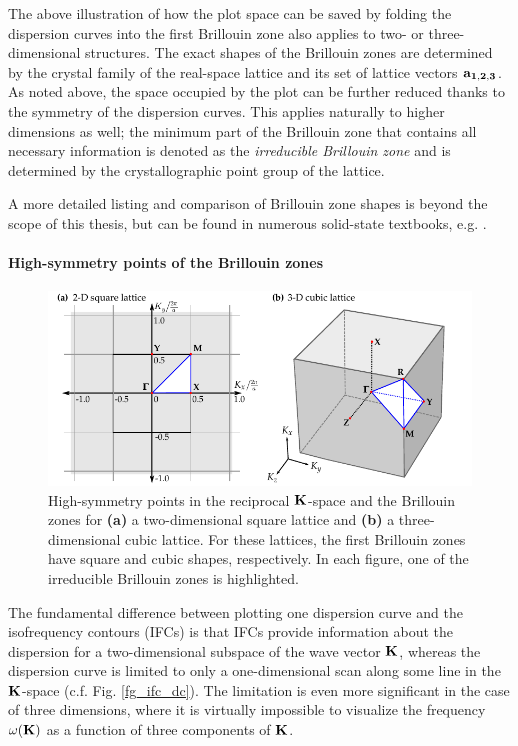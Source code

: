 The above illustration of how the plot space can be saved by folding the dispersion curves into the first Brillouin zone also applies to two- or three-dimensional structures.
The exact shapes of the Brillouin zones are determined by the crystal family of the real-space lattice and its set of lattice vectors ${\mathbf{a_{1,2,3}}}$. 
As noted above, the space occupied by the plot can be further reduced thanks to the symmetry of the dispersion curves. This applies naturally to higher dimensions as well; the minimum part of the Brillouin zone that contains all necessary information is denoted as the \textit{irreducible Brillouin zone} and is determined by the crystallographic point group of the lattice. 

A more detailed listing and comparison of Brillouin zone shapes is beyond the scope of this thesis, but can be found in numerous solid-state textbooks, e.g. \cite[pp. 96-99]{klingshirn2007semiconductor}. 

\paragraph{High-symmetry points of the Brillouin zones} %
\begin{figure}[t] \caption{High-symmetry points in the reciprocal ${\mathbf{K}}$-space and the Brillouin zones for \textbf{(a)} a two-dimensional square lattice and \textbf{(b)} a three-dimensional cubic lattice. For these lattices, the first Brillouin zones have square and cubic shapes, respectively. In each figure, one of the irreducible Brillouin zones is highlighted.  } \label{fg_phcbrillouin} \centering 
	\includegraphics[width=.9\textwidth]{img/PhC_high_symmetry_points.pdf}
\end{figure}
The fundamental difference between plotting one dispersion curve and the isofrequency contours (IFCs) is that IFCs provide information about the dispersion for a two-dimensional subspace of the wave vector ${\mathbf{K}}$, whereas the dispersion curve is limited to only a one-dimensional scan along some line in the ${\mathbf{K}}$-space (c.f. Fig. \ref{fg_ifc_dc}). The limitation is even more significant in the case of three dimensions, where it is virtually impossible to visualize the frequency $\omega({\mathbf{K}})$ as a function of three components of ${\mathbf{K}}$.

